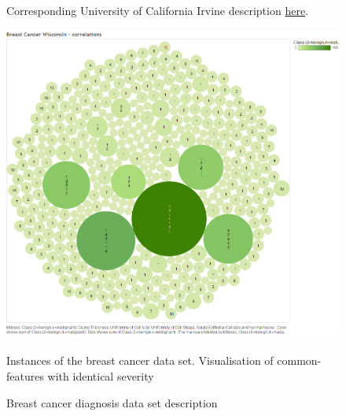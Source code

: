 \documentclass[a4paper,12pt, oneside]{memoir}
\begin{document}
\begin{figure}[h]
\begin{minipage}[h]{0.4\textwidth}
      Corresponding University of California Irvine description \href{https://archive.ics.uci.edu/ml/datasets/Breast+Cancer+Wisconsin+\%28Diagnostic\%29}{here}. \cite{uci-machine-learning-repo-2013}
  \end{minipage}
  \hfill
  \begin{minipage}[h]{0.5\textwidth}
    \includegraphics[scale=0.3] {Breast_cancer_Wisconsin_Visualisation}
    \caption {Instances of the breast cancer data set. Visualisation of common-features with identical severity}
    \label{breast-cancer-visualization}
  \end{minipage}
  \caption{Breast cancer diagnosis data set description}
  \label{breast-cancer-diagnosis-data set-description}
\end{figure}
\end{document}
